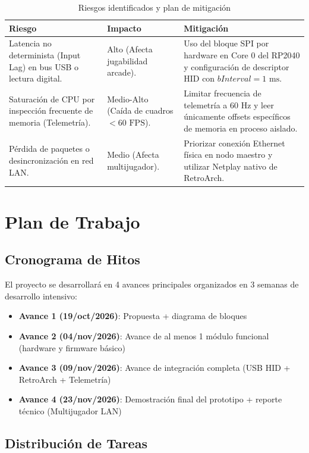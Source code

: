 \documentclass[conference]{IEEEtran}
\begin{document}
\begin{table}[H]
	\centering
	\caption{Riesgos identificados y plan de mitigación}
	\label{tab:riesgos}
	\small
	\begin{tabular}{|p{2.3cm}|p{2.3cm}|p{2.7cm}|}
		\hline
		\textbf{Riesgo} & \textbf{Impacto} & \textbf{Mitigación} \\
		\hline
		Latencia no determinista (Input Lag) en bus USB o lectura digital. & Alto (Afecta jugabilidad arcade). & Uso del bloque SPI por hardware en Core 0 del RP2040 y configuración de descriptor HID con $bInterval = 1\text{ ms}$. \\
		\hline
		Saturación de CPU por inspección frecuente de memoria (Telemetría). & Medio-Alto (Caída de cuadros $< 60\text{ FPS}$). & Limitar frecuencia de telemetría a $60\text{ Hz}$ y leer únicamente offsets específicos de memoria en proceso aislado. \\
		\hline
		Pérdida de paquetes o desincronización en red LAN. & Medio (Afecta multijugador). & Priorizar conexión Ethernet física en nodo maestro y utilizar Netplay nativo de RetroArch. \\
		\hline
	\end{tabular}
\end{table}

\section{Plan de Trabajo}

\subsection{Cronograma de Hitos}

El proyecto se desarrollará en 4 avances principales organizados en 3 semanas de desarrollo intensivo:
\begin{itemize}
	\item \textbf{Avance 1 (19/oct/2026)}: Propuesta + diagrama de bloques
	\item \textbf{Avance 2 (04/nov/2026)}: Avance de al menos 1 módulo funcional (hardware y firmware básico)
	\item \textbf{Avance 3 (09/nov/2026)}: Avance de integración completa (USB HID + RetroArch + Telemetría)
	\item \textbf{Avance 4 (23/nov/2026)}: Demostración final del prototipo + reporte técnico (Multijugador LAN)
\end{itemize}

\subsection{Distribución de Tareas}
\end{document}
